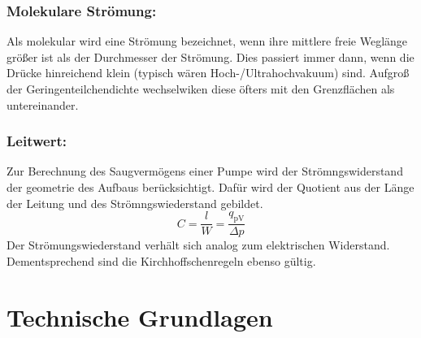 \subsubsection{Molekulare Strömung:}
Als molekular wird eine Strömung bezeichnet, wenn ihre mittlere freie Weglänge größer ist als der Durchmesser der Strömung. Dies passiert immer dann, wenn die Drücke hinreichend klein (typisch wären Hoch-/Ultrahochvakuum) sind. Aufgroß der Geringenteilchendichte wechselwiken diese öfters mit den Grenzflächen als untereinander.

\subsubsection{Leitwert:}
Zur Berechnung des Saugvermögens einer Pumpe wird der Strömngswiderstand der geometrie des Aufbaus berücksichtigt. Dafür wird der Quotient aus der Länge der Leitung und des Strömngswiederstand gebildet.
\begin{equation}
  C = \frac{l}{W} = \frac{q_\text{pV}}{\Delta p}
\end{equation}
Der Strömungswiederstand verhält sich analog zum elektrischen Widerstand. Dementsprechend sind die Kirchhoffschenregeln ebenso gültig. 

\section{Technische Grundlagen}

